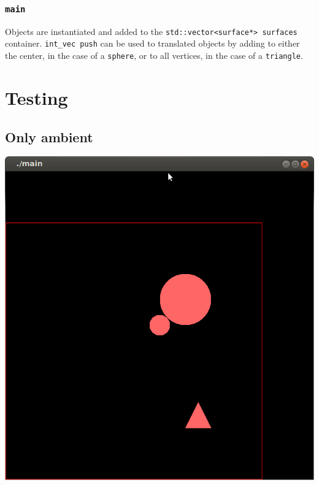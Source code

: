 \documentclass[12pt]{article}
\begin{document}
\subsubsection{\texttt{main}}

Objects are instantiated and added to the \texttt{std::vector<surface*> surfaces} container. \texttt{int\_vec push} can be used to translated objects by adding to either the center, in the case of a \texttt{sphere}, or to all vertices, in the case of a \texttt{triangle}.

\section{Testing}

\subsection{Only ambient}
\includegraphics[scale=.75]{ambient.png}
\end{document}
